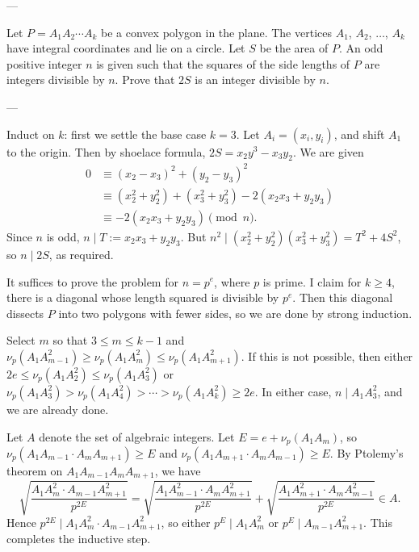 
---

Let $P=A_1A_2\cdots A_k$ be a convex polygon in the plane. The vertices $A_1$, $A_2$, $\ldots$, $A_k$ have integral coordinates and lie on a circle. Let $S$ be the area of $P$. An odd positive integer $n$ is given such that the squares of the side lengths of $P$ are integers divisible by $n$. Prove that $2S$ is an integer divisible by $n$.

---

Induct on $k$: first we settle the base case $k=3$. Let $A_i=(x_i,y_i)$, and shift $A_1$ to the origin. Then by shoelace formula, $2S=x_2y^3-x_3y_2$. We are given
\begin{align*}
    0&\equiv(x_2-x_3)^2+(y_2-y_3)^2\\
    &\equiv\left(x_2^2+y_2^2\right)+\left(x_3^2+y_3^2\right)-2(x_2x_3+y_2y_3)\\
    &\equiv-2(x_2x_3+y_2y_3)\pmod n.
\end{align*}
Since $n$ is odd, $n\mid T:=x_2x_3+y_2y_3$. But $n^2\mid\left(x_2^2+y_2^2\right)\left(x_3^2+y_3^2\right)=T^2+4S^2$, so $n\mid2S$, as required.

It suffices to prove the problem for $n=p^e$, where $p$ is prime. I claim for $k\ge4$, there is a diagonal whose length squared is divisible by $p^e$. Then this diagonal dissects $P$ into two polygons with fewer sides, so we are done by strong induction.

Select $m$ so that $3\le m\le k-1$ and $\nu_p(A_1A_{m-1}^2)\ge\nu_p(A_1A_m^2)\le\nu_p(A_1A_{m+1}^2)$. If this is not possible, then either $2e\le\nu_p(A_1A_2^2)\le\nu_p(A_1A_3^2)$ or $\nu_p(A_1A_3^2)>\nu_p(A_1A_4^2)>\cdots>\nu_p(A_1A_k^2)\ge2e$. In either case, $n\mid A_1A_3^2$, and we are already done.

Let $A$ denote the set of algebraic integers. Let $E=e+\nu_p(A_1A_m)$, so $\nu_p(A_1A_{m-1}\cdot A_mA_{m+1})\ge E$ and $\nu_p(A_1A_{m+1}\cdot A_mA_{m-1})\ge E$. By Ptolemy's theorem on $A_1A_{m-1}A_mA_{m+1}$, we have \[\sqrt{\frac{A_1A_m^2\cdot A_{m-1}A_{m+1}^2}{p^{2E}}}=\sqrt{\frac{A_1A_{m-1}^2\cdot A_mA_{m+1}^2}{p^{2E}}}+\sqrt{\frac{A_1A_{m+1}^2\cdot A_mA_{m-1}^2}{p^{2E}}}\in A.\]
Hence $p^{2E}\mid A_1A_m^2\cdot A_{m-1}A_{m+1}^2$, so either $p^E\mid A_1A_m^2$ or $p^E\mid A_{m-1}A_{m+1}^2$. This completes the inductive step.

